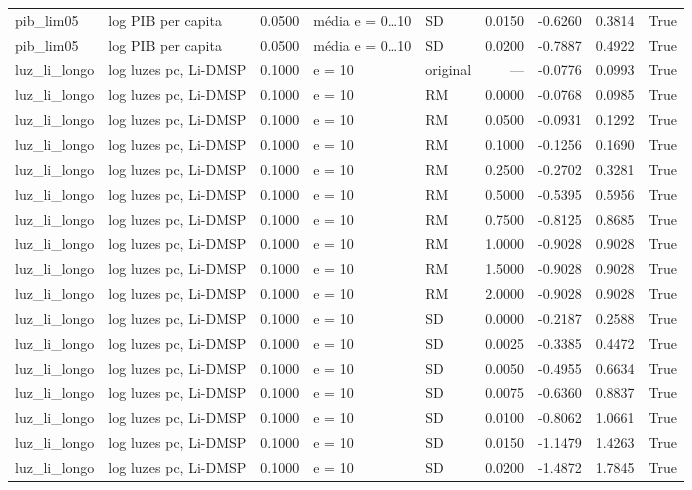 \begin{table}
{\begin{tabular}{llrllrrrr}
pib\_lim05 & log PIB per capita & 0.0500 & média e = 0…10 & SD & 0.0150 & -0.6260 & 0.3814 & True \\
pib\_lim05 & log PIB per capita & 0.0500 & média e = 0…10 & SD & 0.0200 & -0.7887 & 0.4922 & True \\
luz\_li\_longo & log luzes pc, Li-DMSP & 0.1000 & e = 10 & original & — & -0.0776 & 0.0993 & True \\
luz\_li\_longo & log luzes pc, Li-DMSP & 0.1000 & e = 10 & RM & 0.0000 & -0.0768 & 0.0985 & True \\
luz\_li\_longo & log luzes pc, Li-DMSP & 0.1000 & e = 10 & RM & 0.0500 & -0.0931 & 0.1292 & True \\
luz\_li\_longo & log luzes pc, Li-DMSP & 0.1000 & e = 10 & RM & 0.1000 & -0.1256 & 0.1690 & True \\
luz\_li\_longo & log luzes pc, Li-DMSP & 0.1000 & e = 10 & RM & 0.2500 & -0.2702 & 0.3281 & True \\
luz\_li\_longo & log luzes pc, Li-DMSP & 0.1000 & e = 10 & RM & 0.5000 & -0.5395 & 0.5956 & True \\
luz\_li\_longo & log luzes pc, Li-DMSP & 0.1000 & e = 10 & RM & 0.7500 & -0.8125 & 0.8685 & True \\
luz\_li\_longo & log luzes pc, Li-DMSP & 0.1000 & e = 10 & RM & 1.0000 & -0.9028 & 0.9028 & True \\
luz\_li\_longo & log luzes pc, Li-DMSP & 0.1000 & e = 10 & RM & 1.5000 & -0.9028 & 0.9028 & True \\
luz\_li\_longo & log luzes pc, Li-DMSP & 0.1000 & e = 10 & RM & 2.0000 & -0.9028 & 0.9028 & True \\
luz\_li\_longo & log luzes pc, Li-DMSP & 0.1000 & e = 10 & SD & 0.0000 & -0.2187 & 0.2588 & True \\
luz\_li\_longo & log luzes pc, Li-DMSP & 0.1000 & e = 10 & SD & 0.0025 & -0.3385 & 0.4472 & True \\
luz\_li\_longo & log luzes pc, Li-DMSP & 0.1000 & e = 10 & SD & 0.0050 & -0.4955 & 0.6634 & True \\
luz\_li\_longo & log luzes pc, Li-DMSP & 0.1000 & e = 10 & SD & 0.0075 & -0.6360 & 0.8837 & True \\
luz\_li\_longo & log luzes pc, Li-DMSP & 0.1000 & e = 10 & SD & 0.0100 & -0.8062 & 1.0661 & True \\
luz\_li\_longo & log luzes pc, Li-DMSP & 0.1000 & e = 10 & SD & 0.0150 & -1.1479 & 1.4263 & True \\
luz\_li\_longo & log luzes pc, Li-DMSP & 0.1000 & e = 10 & SD & 0.0200 & -1.4872 & 1.7845 & True \\

\end{tabular}}
\end{table}
